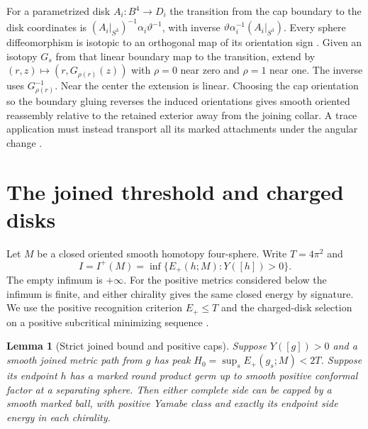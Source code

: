 \documentclass[11pt,letterpaper]{article}
\numberwithin{equation}{section}
\newtheorem{lemma}[theorem]{Lemma}
\begin{document}
For a parametrized disk \(A_i:B^4\to D_i\) the transition from
the cap boundary to the disk coordinates is
\((A_i|_{S^3})^{-1}\alpha_i\vartheta^{-1}\), with inverse
\(\vartheta\alpha_i^{-1}(A_i|_{S^3})\).
Every sphere diffeomorphism is isotopic to an orthogonal map of
its orientation sign \cite[p.~553]{Hatcher1983Smale}.
Given an isotopy \(G_s\) from that linear boundary map to the
transition, extend by \((r,z)\mapsto(r,G_{\rho(r)}(z))\)
with \(\rho=0\) near zero and \(\rho=1\) near one.
The inverse uses \(G_{\rho(r)}^{-1}\). Near the center the
extension is linear. Choosing the cap orientation so the
boundary gluing reverses the induced orientations gives smooth
oriented reassembly relative to the retained exterior away
from the joining collar. A trace application must instead
transport all its marked attachments under the angular change
\cite{Baker2026HandleCuts}.

\section{The joined threshold and charged disks}

Let \(M\) be a closed oriented smooth homotopy four-sphere.
Write \(T=4\pi^2\) and
\[
 I=I^+(M)=\inf\{E_+(h;M):Y([h])>0\}.
\]
The empty infimum is \(+\infty\). For the positive metrics
considered below the infimum is finite, and either chirality gives
the same closed energy by signature. We use the positive recognition criterion \(E_+\le T\)
\cite[Recognition]{Baker2026ChiralMaster} and the charged-disk selection
on a positive subcritical minimizing sequence
\cite[A comparison scale carrying diffuse Weyl curvature]{Baker2026FixedDescent}.

\begin{lemma}[Strict joined bound and positive caps]\label{lem:cap}
Suppose \(Y([g])>0\) and a smooth joined metric path from \(g\)
has peak \(H_0=\sup_s E_+(g_s;M)<2T\). Suppose its endpoint
\(h\) has a marked round product germ up to smooth positive
conformal factor at a separating sphere. Then either complete
side can be capped by a smooth marked ball, with positive Yamabe
class and exactly its endpoint side energy in each chirality.
\end{lemma}
\end{document}
